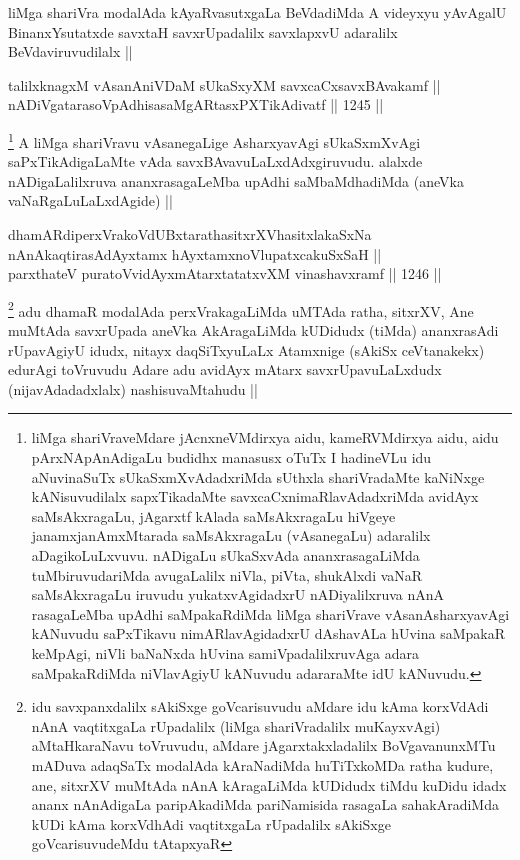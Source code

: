 \begin{artha}
liMga shariVra modalAda kAyaRvasutxgaLa BeVdadiMda A videyxyu yAvAgalU BinanxYsutatxde savxtaH savxrUpadalilx savxlapxvU adaralilx BeVdaviruvudilalx ||
\end{artha}


\begin{shl}
talilxknagxM vAsanAniVDaM sUkaSxyXM savxcaCxsavxBAvakamf || \\
nADiVgatarasoVpAdhisasaMgARtasxPXTikAdivatf ||  1245 || 
\end{shl}

\begin{artha}
\footnote{liMga shariVraveMdare jAcnxneVMdirxya aidu, kameRVMdirxya aidu, aidu pArxNApAnAdigaLu budidhx manasusx oTuTx I hadineVLu idu aNuvinaSuTx sUkaSxmXvAdadxriMda sUthxla shariVradaMte kaNiNxge kANisuvudilalx sapxTikadaMte savxcaCxnimaRlavAdadxriMda avidAyx saMsAkxragaLu, jAgarxtf kAlada saMsAkxragaLu hiVgeye janamxjanAmxMtarada saMsAkxragaLu (vAsanegaLu) adaralilx aDagikoLuLxvuvu. nADigaLu sUkaSxvAda ananxrasagaLiMda tuMbiruvudariMda avugaLalilx niVla, piVta, shukAlxdi vaNaR saMsAkxragaLu iruvudu yukatxvAgidadxrU nADiyalilxruva nAnA rasagaLeMba upAdhi saMpakaRdiMda liMga shariVrave vAsanAsharxyavAgi kANuvudu saPxTikavu nimARlavAgidadxrU dAshavALa hUvina saMpakaR keMpAgi, niVli baNaNxda hUvina samiVpadalilxruvAga adara saMpakaRdiMda niVlavAgiyU kANuvudu adararaMte idU kANuvudu.}
A liMga shariVravu vAsanegaLige AsharxyavAgi sUkaSxmXvAgi saPxTikAdigaLaMte vAda savxBAvavuLaLxdAdxgiruvudu. alalxde nADigaLalilxruva ananxrasagaLeMba upAdhi saMbaMdhadiMda (aneVka vaNaRgaLuLaLxdAgide) ||
\end{artha}


\begin{shl}
dhamARdiperxVrakoVdUBxtarathasitxrXVhasitxlakaSxNa \\
nAnAkaqtirasAdAyxtamx hAyxtamxnoV\s lupatxcakuSxSaH || \\
parxthateV puratoV\s vidAyxmAtarxtatatxvXM vinashavxramf ||  1246 ||  
\end{shl}

\begin{artha}
\footnote{idu savxpanxdalilx sAkiSxge goVcarisuvudu aMdare idu kAma korxVdAdi nAnA vaqtitxgaLa rUpadalilx (liMga shariVradalilx muKayxvAgi) aMtaHkaraNavu toVruvudu, aMdare jAgarxtakxladalilx BoVgavanunxMTu mADuva adaqSaTx modalAda kAraNadiMda huTiTxkoMDa ratha kudure, ane, sitxrXV muMtAda nAnA kAragaLiMda kUDidudx tiMdu kuDidu idadx ananx nAnAdigaLa paripAkadiMda pariNamisida rasagaLa sahakAradiMda kUDi kAma korxVdhAdi vaqtitxgaLa rUpadalilx sAkiSxge goVcarisuvudeMdu tAtapxyaR}
adu dhamaR modalAda perxVrakagaLiMda uMTAda ratha, sitxrXV, Ane muMtAda savxrUpada aneVka AkAragaLiMda kUDidudx (tiMda) ananxrasAdi rUpavAgiyU idudx, nitayx daqSiTxyuLaLx Atamxnige (sAkiSx ceVtanakekx) edurAgi toVruvudu Adare adu avidAyx mAtarx savxrUpavuLaLxdudx (nijavAdadadxlalx) nashisuvaMtahudu || 
\end{artha}

